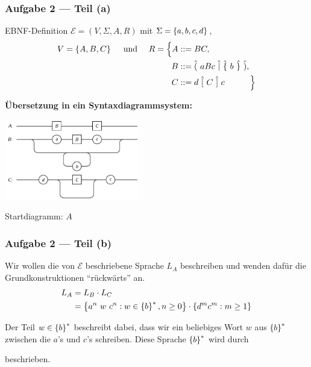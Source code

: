 \documentclass{beamer}
\begin{document}
\begin{frame} \frametitle{Aufgabe 2 --- Teil (a)}
	\small
	EBNF-Definition $\mathcal{E} = (V,\Sigma,A,R)$ mit $\Sigma = \left\{ a,b,c,d \right\}$,
	\begin{align*}
		V = \left\{ A,B,C \right\} 
		\quad \text{ und } \quad
		R = \Big\{ A &::= BC , \\ 
				   B &::= \hat{(} \ aBc \ \hat{|} \ \hat{\{} \ b \ \hat{\}} \ \hat{)} , \\
				   C &::= d \ \hat{[} \ C \ \hat{]} \ c 
		    \qquad\quad \Big\}
	\end{align*}

	\pause
	
	\textbf{Übersetzung in ein Syntaxdiagrammsystem:}
	
	\centering
	\includegraphics[height=3.5cm]{tut02_syntax-dia-2a.pdf}
	
	Startdiagramm: $A$
\end{frame}

\begin{frame} \frametitle{Aufgabe 2 --- Teil (b)}
	Wir wollen die von $\mathcal{E}$ beschriebene Sprache $L_A$ beschreiben und wenden dafür die Grundkonstruktionen \enquote{rückwärts} an. \pause
	\begin{align*}
		L_A &= L_B \cdot L_C \\
		&= \left\{  a^n \ w \ c^n : w \in \left\{ b \right\}^\ast, n \ge 0 \right\} \cdot \left\{ d^m c^m : m \ge 1 \right\}
	\end{align*}
	
	Der Teil $w \in \left\{ b \right\}^\ast$ beschreibt dabei, dass wir ein beliebiges Wort $w$ aus $\left\{ b \right\}^\ast$ zwischen die $a$'s und $c$'s schreiben. Diese Sprache $\left\{ b \right\}^\ast$ wird durch 
	\begin{center}
	\end{center}
	beschrieben.

\end{frame}
\end{document}
